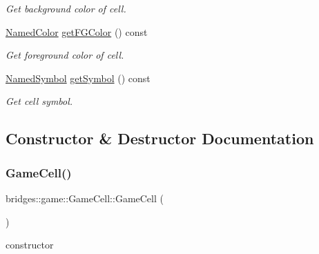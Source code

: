 \begin{DoxyCompactItemize}
\begin{DoxyCompactList}\small\item\em Get background color of cell. \end{DoxyCompactList}\item 
\hyperlink{namespacebridges_1_1game_afaa832a4322b25b6a4ebfba832f10f26}{Named\+Color} \hyperlink{classbridges_1_1game_1_1_game_cell_af9269057618ffdd503768ccd6b6e6f56}{get\+F\+G\+Color} () const
\begin{DoxyCompactList}\small\item\em Get foreground color of cell. \end{DoxyCompactList}\item 
\hyperlink{namespacebridges_1_1game_ab9a19c7ab6e2ebac2f95180e21733487}{Named\+Symbol} \hyperlink{classbridges_1_1game_1_1_game_cell_a55ed5769afe548a707117379425613f0}{get\+Symbol} () const
\begin{DoxyCompactList}\small\item\em Get cell symbol. \end{DoxyCompactList}\end{DoxyCompactItemize}


\subsection{Constructor \& Destructor Documentation}
\mbox{\label{classbridges_1_1game_1_1_game_cell_a750114853f2f0f7519cb663352230868}} 
\subsubsection{\texorpdfstring{Game\+Cell()}{GameCell()}\hspace{0.1cm}{\footnotesize\ttfamily [1/2]}}
{\footnotesize\ttfamily bridges\+::game\+::\+Game\+Cell\+::\+Game\+Cell (\begin{DoxyParamCaption}{ }\end{DoxyParamCaption})\hspace{0.3cm}{\ttfamily [inline]}}



constructor 

\mbox{\label{classbridges_1_1game_1_1_game_cell_a743b618fc8553aa9aac33ddc3bb65a79}} 
